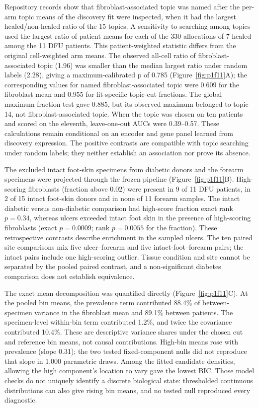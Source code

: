 Repository records show that fibroblast-associated topic was named after the per-arm topic means of the discovery fit were inspected, when it had the largest healed/non-healed ratio of the 15 topics. A sensitivity to searching among topics used the largest ratio of patient means for each of the 330 allocations of 7 healed among the 11 DFU patients. This patient-weighted statistic differs from the original cell-weighted arm means. The observed all-cell ratio of fibroblast-associated topic (1.96) was smaller than the median largest ratio under random labels (2.28), giving a maximum-calibrated p of 0.785 (Figure~\ref{fig:p1f11}A\label{call:p1f11}); the corresponding values for named fibroblast-associated topic were 0.609 for the fibroblast mean and 0.955 for fit-specific topic-cut fractions. The global maximum-fraction test gave 0.885, but its observed maximum belonged to topic 14, not fibroblast-associated topic. When the topic was chosen on ten patients and scored on the eleventh, leave-one-out AUCs were 0.39--0.57. These calculations remain conditional on an encoder and gene panel learned from discovery expression. The positive contrasts are compatible with topic searching under random labels; they neither establish an association nor prove its absence.

The excluded intact foot-skin specimens from diabetic donors and the forearm specimens were projected through the frozen pipeline (Figure~\ref{fig:p1f11}B). High-scoring fibroblasts (fraction above 0.02) were present in 9 of 11 DFU patients, in 2 of 15 intact foot-skin donors and in none of 11 forearm samples. The intact diabetic versus non-diabetic comparison had high-score fraction exact rank $p=0.34$, whereas ulcers exceeded intact foot skin in the presence of high-scoring fibroblasts (exact $p=0.0009$; rank $p=0.0055$ for the fraction). These retrospective contrasts describe enrichment in the sampled ulcers. The ten paired site comparisons mix five ulcer--forearm and five intact-foot--forearm pairs; the intact pairs include one high-scoring outlier. Tissue condition and site cannot be separated by the pooled paired contrast, and a non-significant diabetes comparison does not establish equivalence.

The exact mean decomposition was quantified directly (Figure~\ref{fig:p1f11}C). At the pooled bin means, the prevalence term contributed 88.4\% of between-specimen variance in the fibroblast mean and 89.1\% between patients. The specimen-level within-bin term contributed 1.2\%, and twice the covariance contributed 10.4\%. These are descriptive variance shares under the chosen cut and reference bin means, not causal contributions. High-bin means rose with prevalence (slope 0.31); the two tested fixed-component nulls did not reproduce that slope in 1,000 parametric draws. Among the fitted candidate densities, allowing the high component's location to vary gave the lowest BIC. Those model checks do not uniquely identify a discrete biological state: thresholded continuous distributions can also give rising bin means, and no tested null reproduced every diagnostic.

